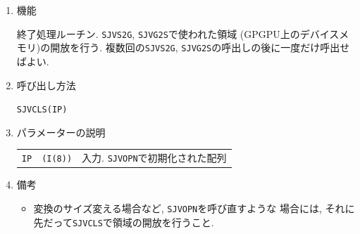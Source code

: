 \documentclass[a4j,fleqn]{jarticle}
\begin{document}
\begin{enumerate}

\item 機能

終了処理ルーチン. {\tt SJVS2G}, {\tt SJVG2S}で使われた領域
(GPGPU上のデバイスメモリ)の開放を行う.
複数回の{\tt SJVS2G}, {\tt SJVG2S}の呼出しの後に一度だけ呼出せばよい.

\item 呼び出し方法

{\tt SJVCLS(IP)}

\item パラメーターの説明

\begin{tabular}{lll}
{\tt IP}  & {\tt (I(8))} & 入力. {\tt SJVOPN}で初期化された配列
\end{tabular}

\item 備考

\begin{itemize}

\item 変換のサイズ変える場合など, {\tt SJVOPN}を呼び直すような
場合には, それに先だって{\tt SJVCLS}で領域の開放を行うこと.

\end{itemize}

\end{enumerate}
\end{document}
